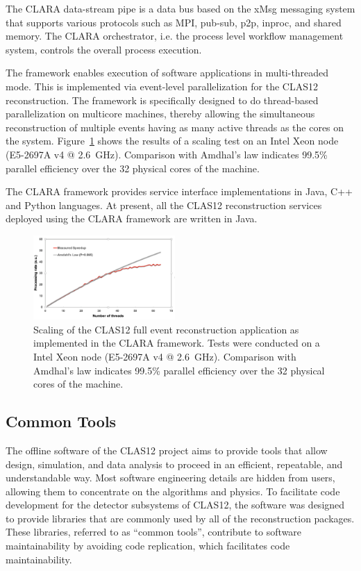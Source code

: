 The CLARA data-stream pipe is a data bus based on the xMsg messaging system that supports various protocols
such as MPI, pub-sub, p2p, inproc, and shared memory. The CLARA orchestrator, i.e. the process level workflow
management system, controls the overall process execution. 

The framework enables execution of software applications in multi-threaded mode. This is implemented via event-level
parallelization for the CLAS12 reconstruction. 
The framework is specifically designed to do thread-based
parallelization on multicore machines, thereby allowing 
the simultaneous reconstruction of multiple events having as many active threads as the cores
on the system.  
Figure~\ref{fig:scaling} shows the results of a scaling test on an
Intel Xeon node (E5-2697A v4 @ 2.6~GHz). Comparison with Amdhal's law indicates 99.5\% parallel efficiency over
the 32 physical cores of the machine.

The CLARA framework provides service interface implementations in Java, C++ and Python languages. 
At present, all the CLAS12 reconstruction services deployed using the CLARA framework are written in Java.

\begin{figure}
\centering
\includegraphics[width=0.48\textwidth]{pics/scaling.png}
\caption{Scaling of the CLAS12 full event reconstruction application as implemented in the CLARA framework. Tests
  were conducted on a Intel Xeon node (E5-2697A v4 @ 2.6~GHz). Comparison with Amdhal's law indicates 99.5\%
  parallel efficiency over the 32 physical cores of the machine.}
\label{fig:scaling}
\end{figure}

\subsection{Common Tools}
\label{common-tools}

The offline software of the CLAS12 project aims to provide tools that allow design, simulation, and data analysis
to proceed in an efficient, repeatable, and understandable way. Most  software engineering details are hidden from
users, allowing them to concentrate on the algorithms and physics. To facilitate code development for the detector
subsystems of CLAS12, the software was designed to provide libraries that are commonly used by all of the
reconstruction packages.  These libraries, referred to as ``common tools'',  contribute to software maintainability 
by avoiding code replication, which facilitates code maintainability.

